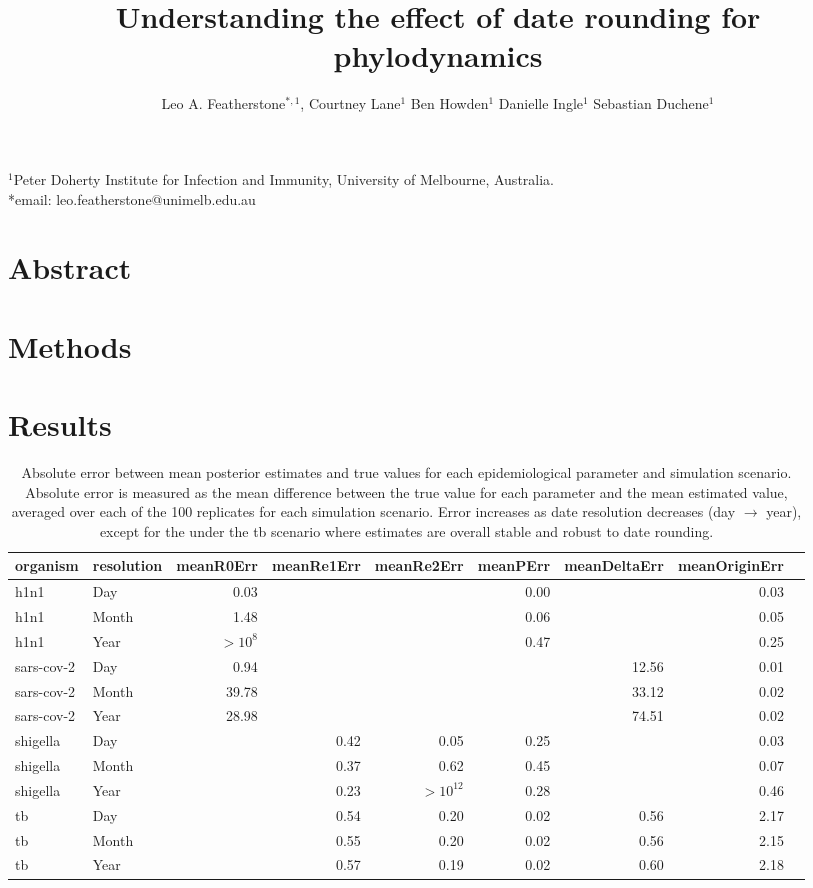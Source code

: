 \documentclass{article}
\title{Understanding the effect of date rounding for phylodynamics}
\author{Leo A. Featherstone$^{\ast,1}$, Courtney Lane$^{1}$ Ben Howden$^{1}$ Danielle Ingle$^{1}$ Sebastian Duchene$^{1}$\\}
\begin{document}
\begin{centering}
\maketitle
\end{centering}
$^{1}$Peter Doherty Institute for Infection and Immunity, University of Melbourne, Australia.\\
*email: leo.featherstone@unimelb.edu.au

\linenumbers
\section*{Abstract}
\section*{Methods}
\section*{Results}

\begin{table}[ht]
\centering
\caption{Absolute error between mean posterior estimates and true values for each epidemiological parameter and simulation scenario. Absolute error is measured as the mean difference between the true value for each parameter and the mean estimated value, averaged over each of the 100 replicates for each simulation scenario. Error increases as date resolution decreases (day $\rightarrow$ year), except for the under the tb scenario where estimates are overall stable and robust to date rounding.}
\label{table:sim_tab}
\begin{tabular}{llrrrrrrr}
  \hline
 organism & resolution & meanR0Err & meanRe1Err & meanRe2Err & meanPErr & meanDeltaErr & meanOriginErr \\ 
  \hline
    h1n1 & Day & 0.03 &  &  & 0.00 &  & 0.03 \\ 
    h1n1 & Month & 1.48 &  &  & 0.06 &  & 0.05 \\ 
    h1n1 & Year & $>10^8$ &  &  & 0.47 &  & 0.25 \\ 
    \hline
    sars-cov-2 & Day & 0.94 &  &  &  & 12.56 & 0.01 \\ 
    sars-cov-2 & Month & 39.78 &  &  &  & 33.12 & 0.02 \\ 
    sars-cov-2 & Year & 28.98 &  &  &  & 74.51 & 0.02 \\ 
    \hline
    shigella & Day &  & 0.42 & 0.05 & 0.25 &  & 0.03 \\ 
    shigella & Month &  & 0.37 & 0.62 & 0.45 &  & 0.07 \\ 
    shigella & Year &  & 0.23 & $>10^{12}$ & 0.28 &  & 0.46 \\ 
    \hline
    tb & Day &  & 0.54 & 0.20 & 0.02 & 0.56 & 2.17 \\ 
    tb & Month &  & 0.55 & 0.20 & 0.02 & 0.56 & 2.15 \\ 
    tb & Year &  & 0.57 & 0.19 & 0.02 & 0.60 & 2.18 \\ 
 \hline
\end{tabular}
\end{table}
\end{document}
